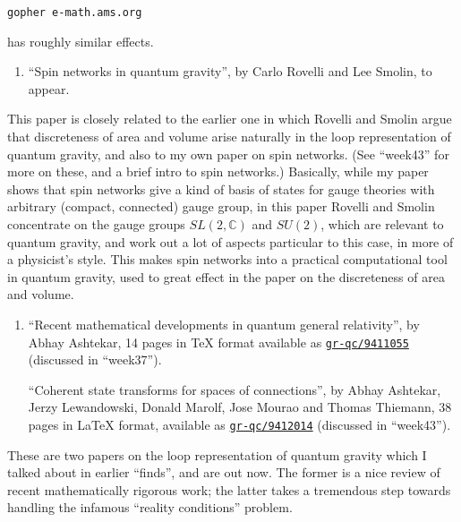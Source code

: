 \documentclass{article}
\def\tightlist{}
\begin{document}
\begin{verbatim}
gopher e-math.ams.org
\end{verbatim}

has roughly similar effects.

\begin{enumerate}
\def\labelenumi{\arabic{enumi})}
\setcounter{enumi}{2}
\tightlist
\item
  ``Spin networks in quantum gravity'', by Carlo Rovelli and Lee Smolin,
  to appear.
\end{enumerate}

This paper is closely related to the earlier one in which Rovelli and
Smolin argue that discreteness of area and volume arise naturally in the
loop representation of quantum gravity, and also to my own paper on spin
networks. (See ``week43'' for more on these, and a brief intro to spin
networks.) Basically, while my paper shows that spin networks give a
kind of basis of states for gauge theories with arbitrary (compact,
connected) gauge group, in this paper Rovelli and Smolin concentrate on
the gauge groups \(SL(2,\mathbb{C})\) and \(SU(2)\), which are relevant
to quantum gravity, and work out a lot of aspects particular to this
case, in more of a physicist's style. This makes spin networks into a
practical computational tool in quantum gravity, used to great effect in
the paper on the discreteness of area and volume.

\begin{enumerate}
\def\labelenumi{\arabic{enumi})}
\setcounter{enumi}{3}
\item
  ``Recent mathematical developments in quantum general relativity'', by
  Abhay Ashtekar, 14 pages in TeX format available as
  \href{http://xxx.lanl.gov/abs/gr-qc/9411055}{\texttt{gr-qc/9411055}}
  (discussed in ``week37'').

  ``Coherent state transforms for spaces of connections'', by Abhay
  Ashtekar, Jerzy Lewandowski, Donald Marolf, Jose Mourao and Thomas
  Thiemann, 38 pages in LaTeX format, available as
  \href{http://xxx.lanl.gov/abs/gr-qc/9412014}{\texttt{gr-qc/9412014}}
  (discussed in ``week43'').
\end{enumerate}

These are two papers on the loop representation of quantum gravity which
I talked about in earlier ``finds'', and are out now. The former is a
nice review of recent mathematically rigorous work; the latter takes a
tremendous step towards handling the infamous ``reality conditions''
problem.
\end{document}
